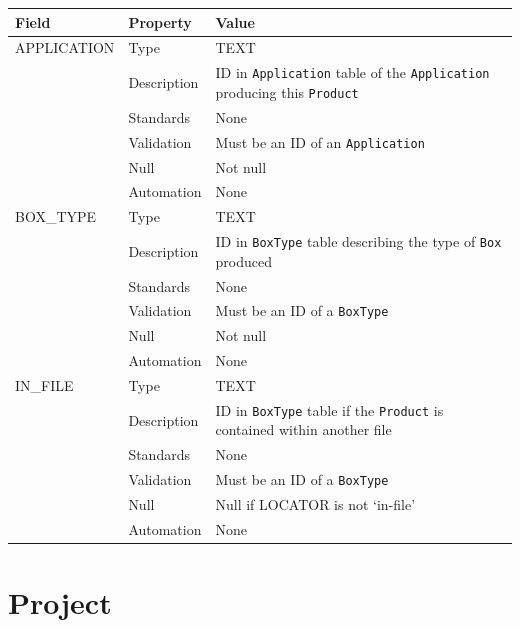 \documentclass[
]{article}
\newcounter{none} %
\begin{document}
{\def\LTcaptype{none} %
\begin{longtable}[]{@{}
  >{\raggedright\arraybackslash}p{}
  >{\raggedright\arraybackslash}p{}
  >{\raggedright\arraybackslash}p{}@{}}
\toprule\noalign{}
\begin{minipage}[b]{\linewidth}\raggedright
Field
\end{minipage} & \begin{minipage}[b]{\linewidth}\raggedright
Property
\end{minipage} & \begin{minipage}[b]{\linewidth}\raggedright
Value
\end{minipage} \\
\midrule\noalign{}
\endhead
\bottomrule\noalign{}
\endlastfoot
APPLICATION & Type & TEXT \\
& Description & ID in \texttt{Application} table of the
\texttt{Application} producing this \texttt{Product} \\
& Standards & None \\
& Validation & Must be an ID of an \texttt{Application} \\
& Null & Not null \\
& Automation & None \\
BOX\_TYPE & Type & TEXT \\
& Description & ID in \texttt{BoxType} table describing the type of
\texttt{Box} produced \\
& Standards & None \\
& Validation & Must be an ID of a \texttt{BoxType} \\
& Null & Not null \\
& Automation & None \\
IN\_FILE & Type & TEXT \\
& Description & ID in \texttt{BoxType} table if the \texttt{Product} is
contained within another file \\
& Standards & None \\
& Validation & Must be an ID of a \texttt{BoxType} \\
& Null & Null if LOCATOR is not `in-file' \\
& Automation & None \\
\end{longtable}
}

\section{Project}\label{project-1}
\end{document}
